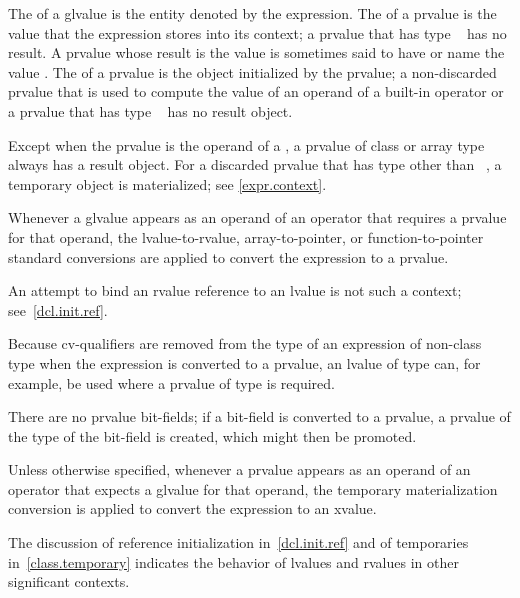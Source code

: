 \pnum
The  of a glvalue is the entity denoted by the expression.
The  of a prvalue
is the value that the expression stores into its context;
a prvalue that has type \cv{}~ has no result.
A prvalue whose result is the value 
is sometimes said to have or name the value .
The  of a prvalue is the object initialized by the prvalue;
a non-discarded prvalue
that is used to compute the value of an operand of a built-in operator
or a prvalue that has type \cv{}~
has no result object.
\begin{note}
Except when the prvalue is the operand of a ,
a prvalue of class or array type always has a result object.
For a discarded prvalue that has type other than \cv{}~,
a temporary object is materialized; see \ref{expr.context}.
\end{note}

\pnum
Whenever a glvalue appears as an operand of an operator that
requires a prvalue for that operand, the
lvalue-to-rvalue, array-to-pointer,
or function-to-pointer standard conversions are
applied to convert the expression to a prvalue.
\begin{note}
An attempt to bind an rvalue reference to an lvalue is not such a context; see~\ref{dcl.init.ref}.
\end{note}
\begin{note}
Because cv-qualifiers are removed from the type of an expression of
non-class type when the expression is converted to a prvalue, an lvalue
of type  can, for example, be used where
a prvalue of type  is required.
\end{note}
\begin{note}
There are no prvalue bit-fields; if a bit-field is converted to a
prvalue, a prvalue of the type of the bit-field is
created, which might then be promoted.
\end{note}

\pnum
Unless otherwise specified,
whenever a prvalue appears as an operand of an operator that
expects a glvalue for that operand, the
temporary materialization conversion is
applied to convert the expression to an xvalue.

\pnum
\begin{note}
The discussion of reference initialization in~\ref{dcl.init.ref} and of
temporaries in~\ref{class.temporary} indicates the behavior of lvalues
and rvalues in other significant contexts.
\end{note}

